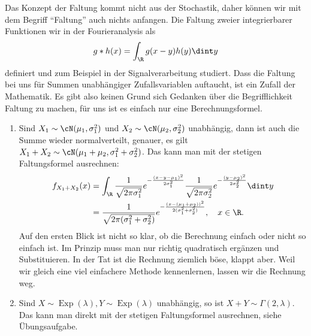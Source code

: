 	Das Konzept der Faltung kommt nicht aus der Stochastik, daher k\"onnen wir mit dem Begriff \enquote{Faltung} auch nichts anfangen. Die Faltung zweier integrierbarer Funktionen wir in der Fourieranalysis als 
	\begin{align*}
		g\ast h (x)=\int_\R g(x-y) h(y)\dint y
	\end{align*}
	definiert und zum Beispiel in der Signalverarbeitung studiert. Dass die Faltung bei uns f\"ur Summen unabh\"angiger Zufallsvariablen auftaucht, ist ein Zufall der Mathematik. Es gibt also keinen Grund sich Gedanken \"uber die Begrifflichkeit Faltung zu machen, f\"ur uns ist es einfach nur eine Berechnungsformel.

\begin{beispiel}\label{B5}\abs
	\begin{enumerate}[label=(\roman*)]\label{bspFaltung}
		\item Sind $X_1 \sim \cN(\mu_1,\sigma_1^2)$ und $X_2 \sim \cN(\mu_2,\sigma_2^2)$ unabhängig, dann ist auch die Summe wieder normalverteilt, genauer, es gilt $X_1 + X_2 \sim \cN(\mu_1 + \mu_2, \sigma_1^2 + \sigma_2^2)$. Das kann man mit der stetigen Faltungsformel ausrechnen:
		\begin{align*}
			f_{X_1 + X_2}(x) &= \int_{\R} \frac{1}{\sqrt{2 \pi \sigma_1^2}} e^{-\frac{(x-y-\mu_1)^2}{2\sigma_1^2}} \frac{1}{\sqrt{2 \pi \sigma_2^2}} e^{-\frac{(y-\mu_2)^2}{2\sigma_2^2}} \dint y\\
			&=\frac{1}{\sqrt{2\pi(\sigma_1^2+\sigma_2^2)}} e^{-\frac{(x-(\mu_1+\mu_2))^2}{2(\sigma_1^2+\sigma_2^2)}},\quad x\in\R.
		\end{align*}
		Auf den ersten Blick ist nicht so klar, ob die Berechnung einfach oder nicht so einfach ist. Im Prinzip muss man nur richtig quadratisch erg\"anzen und Substituieren. In der Tat ist die Rechnung ziemlich b\"ose, klappt aber. Weil wir gleich eine viel einfachere Methode kennenlernen, lassen wir die Rechnung weg.
		\item Sind $X \sim \operatorname{Exp}(\lambda), Y \sim \operatorname{Exp}(\lambda)$ unabhängig, so ist $X + Y \sim \Gamma(2,\lambda)$. Das kann man direkt mit der stetigen Faltungsformel ausrechnen, siehe \"Ubungsaufgabe.
	\end{enumerate}
\end{beispiel}

